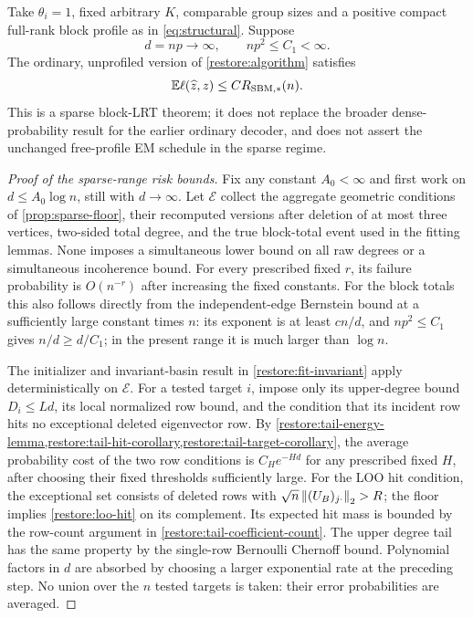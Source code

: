 \begin{theorem}
\label{restore:sbm-theorem}
Take $\theta_i=1$, fixed arbitrary $K$, comparable group sizes and a
positive compact full-rank block profile as in
\eqref{eq:structural}. Suppose
\[
 d=np\longrightarrow\infty,\qquad np^2\le C_1<\infty.
\]
The ordinary, unprofiled version of \cref{restore:algorithm} satisfies
\[
 \mathbb E\ell(\widehat z,z)\le C R_{\mathrm{SBM},*}(n).
\]
This is a sparse block-LRT theorem; it does not replace the broader
dense-probability result for the earlier ordinary decoder, and does not
assert the unchanged free-profile EM schedule in the sparse regime.
\end{theorem}

\begin{proof}[Proof of the sparse-range risk bounds]
Fix any constant $A_0<\infty$ and first work on
$d\le A_0\log n$, still with $d\to\infty$.
Let $\mathcal E$ collect the aggregate geometric conditions of
\cref{prop:sparse-floor}, their recomputed versions after deletion of
at most three vertices, two-sided total degree, and the true block-total event used
in the fitting lemmas. None imposes a simultaneous lower bound on all
raw degrees or a simultaneous incoherence bound. For every prescribed
fixed $r$, its failure probability is $O(n^{-r})$ after increasing the
fixed constants. For the block totals this also follows directly from
the independent-edge Bernstein bound at a sufficiently large constant
times $n$: its exponent is at least $cn/d$, and $np^2\le C_1$ gives
$n/d\ge d/C_1$; in the present range it is much larger than $\log n$.

The initializer and invariant-basin result in
\cref{restore:fit-invariant} apply deterministically on $\mathcal E$.
For a tested target $i$, impose only its upper-degree bound
$D_i\le Ld$, its local normalized row bound, and the condition that its
incident row hits no exceptional deleted eigenvector row. By
\cref{restore:tail-energy-lemma,restore:tail-hit-corollary,restore:tail-target-corollary}, the average probability cost
of the two row conditions is $C_He^{-Hd}$ for any prescribed fixed $H$,
after choosing their fixed thresholds sufficiently large. For the
LOO hit condition, the exceptional set consists of deleted rows with
$\sqrt n\left\lVert(U_B)_{j\cdot}\right\rVert_2>R$; the floor implies
\eqref{restore:loo-hit} on its complement. Its expected hit mass
is bounded by the row-count argument in
\eqref{restore:tail-coefficient-count}.
The upper
degree tail has the same property by the single-row Bernoulli Chernoff
bound. Polynomial factors in $d$ are absorbed by choosing a larger
exponential rate at the preceding step. No union over the $n$ tested
targets is taken: their error probabilities are averaged.


\end{proof}
